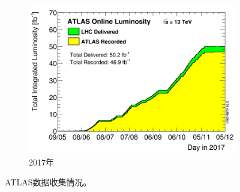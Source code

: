 \begin{figure}[!htbp]
\begin{subfigure}[b]{0.45\textwidth}
      \includegraphics[width=\textwidth]{fig/sumLumiByDay_2017.png}
      \caption{2017年}
      \label{fig:data_taking_2017}
    \end{subfigure}
    \caption{ATLAS数据收集情况。}
    \label{fig:data_taking}
\end{figure}
